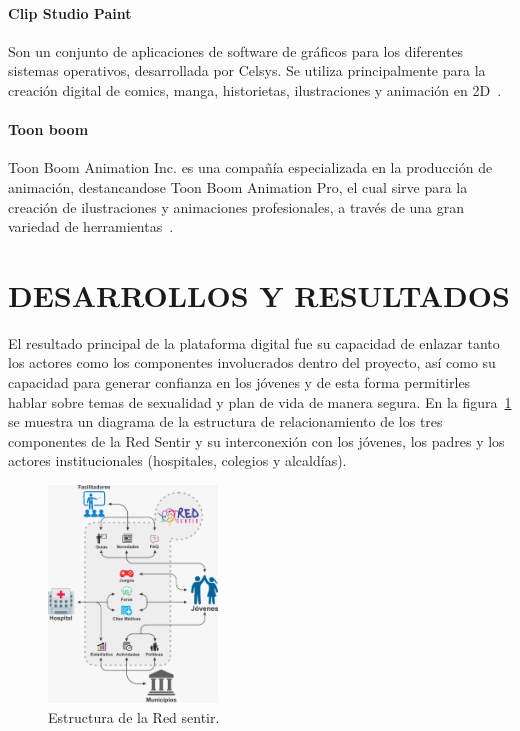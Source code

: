 \documentclass[journal,transmag]{IEEEtran}
\begin{document}
\paragraph{Clip Studio Paint} Son un conjunto de aplicaciones de software de gráficos para los diferentes sistemas operativos, desarrollada por Celsys. Se utiliza principalmente para la creación digital de comics, manga, historietas, ilustraciones y animación en 2D~\cite{ClipP}.

\paragraph{Toon boom} Toon Boom Animation Inc. es una compañía especializada en la producción de animación, destancandose Toon Boom Animation Pro, el cual sirve para la creación de ilustraciones y animaciones profesionales, a través de una gran variedad de herramientas~\cite{ToonB}. 

\section{DESARROLLOS Y RESULTADOS}\label{sec:resultados}

El resultado principal de la plataforma digital fue su capacidad de enlazar tanto los actores como los componentes involucrados dentro del proyecto, así como su capacidad para generar confianza en los jóvenes y de esta forma permitirles hablar sobre temas de sexualidad y plan de vida de manera segura. En la figura~\ref{fig:estructura} se muestra un diagrama de la estructura de relacionamiento de los tres componentes de la Red Sentir y su interconexión con los jóvenes, los padres y los actores institucionales (hospitales, colegios y alcaldías). 

\begin{figure}[t]
\centering
\includegraphics[width=0.4\textwidth]{plataforma_relacion.jpeg}
\caption{Estructura de la Red sentir.}
\label{fig:estructura}
\end{figure}
\end{document}
